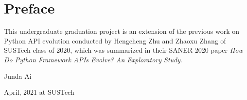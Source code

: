\chapter{Preface}
\label{chap:preface}
\vskip 28pt

This undergraduate graduation project is an extension of the previous work on Python API evolution conducted by Hengcheng Zhu and Zhaoxu Zhang of SUSTech class of 2020, which was summarized in their SANER 2020 paper \textit{How Do Python Framework APIs Evolve? An Exploratory Study}.

\begin{flushright}

Junda Ai

April, 2021 at SUSTech

\end{flushright}
